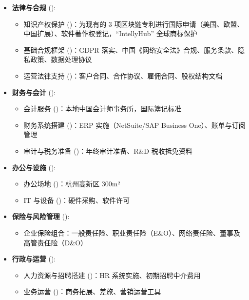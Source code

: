 \documentclass[11pt, a4paper, oneside]{article}
\begin{document}
\begin{itemize}
    \item \textbf{法律与合规} ():
    \begin{itemize}
        \item 知识产权保护 ()：为现有的 3 项区块链专利进行国际申请（美国、欧盟、中国扩展）、软件著作权登记，``IntellyHub'' 全球商标保护
        \item 基础合规框架 ()：GDPR 落实、中国《网络安全法》合规、服务条款、隐私政策、数据处理协议
        \item 运营法律支持 ()：客户合同、合作协议、雇佣合同、股权结构文档
    \end{itemize}
    
    \item \textbf{财务与会计} ():
    \begin{itemize}
        \item 会计服务 ()：本地中国会计师事务所，国际簿记标准
        \item 财务系统搭建 ()：ERP 实施（NetSuite/SAP Business One）、账单与订阅管理
        \item 审计与税务准备 ()：年终审计准备、R\&D 税收抵免资料
    \end{itemize}
    
    \item \textbf{办公与设施} ():
    \begin{itemize}
        \item 办公场地 ()：杭州高新区 300m²
        \item IT 与设备 ()：硬件采购、软件许可
    \end{itemize}
    
    \item \textbf{保险与风险管理} ():
    \begin{itemize}
        \item 企业保险组合：一般责任险、职业责任险（E\&O）、网络责任险、董事及高管责任险（D\&O）
    \end{itemize}
    
    \item \textbf{行政与运营} ():
    \begin{itemize}
        \item 人力资源与招聘搭建 ()：HR 系统实施、初期招聘中介费用
        \item 业务运营 ()：商务拓展、差旅、营销运营工具
    \end{itemize}
\end{itemize}
\end{document}
